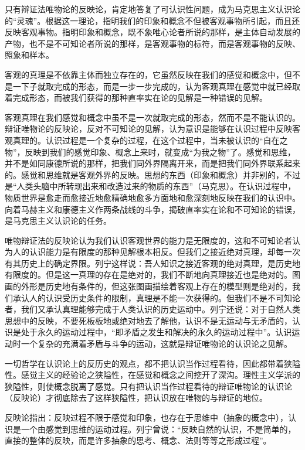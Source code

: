 只有辩证法唯物论的反映论，肯定地答复了可认识性问题，成为马克思主义认识论的“灵魂”。根据这一理论，指明我们的印象和概念不但被客观事物所引起，而且还反映客观事物。指明印象和概念，既不象唯心论者所说的那样，是主体自动发展的产物，也不是不可知论者所说的那样，是客观事物的标符，而是客观事物的反映、照象和样本。

客观的真理是不依靠主体而独立存在的，它虽然反映在我们的感觉和概念中，但不是一下子就取完成的形态，而是一步一步完成的，认为客观真理在感觉中就已经取着完成形态，而被我们获得的那种直率实在论的见解是一种错误的见解。

客观真理在我们感觉和概念中虽不是一次就取完成的形态，然而不是不能认识的。辩证唯物论的反映论，反对不可知论的见解，认为意识是能够在认识过程中反映客观真理的。认识过程是一个复杂的过程，在这个过程中，当未被认识的“自在之物”，反映到我们的感觉印象、概念上来时，就变成“为我之物”了。感觉和思维，并不是如同康德所说的那样，把我们同外界隔离开来，而是把我们同外界联系起来的。感觉和思维就是客观外界的反映。思想的东西（印象和概念）并非别的，不过是“人类头脑中所转现出来和改造过来的物质的东西”（马克思）。在认识过程中，物质世界是愈走而愈接近地愈精确地愈多方面地和愈深刻地反映在我们的认识中。向着马赫主义和康德主义作两条战线的斗争，揭破直率实在论和不可知论的错误，是马克思主义认识论的任务。

唯物辩证法的反映论认为我们认识客观世界的能力是无限度的，这和不可知论者认为人的认识能力是有限度的那种见解根本相反。但我们之接近绝对真理，却每一次有其历史上的确定界限。列宁这样说：吾人知识之接近客观的绝对真理，是历史地有限度的。但是这一真理的存在是绝对的，我们不断地向真理接近也是绝对的。图画的外形是历史地有条件的，但这张图画描绘着客观上存在的模型则是绝对的，我们承认人的认识受历史条件的限制，真理是不能一次获得的。但我们不是不可知论者，我们又承认真理能够完成于人类认识的历史运动中。列宁还说：对于自然人类思想中的反映，不要死板板地或绝对地去了解他，认识不是无运动与无矛盾的，认识是处于永久的运动过程中，“即矛盾之发生和解决的永久的运动过程中”。认识运动时一个复杂的充满着矛盾与斗争的运动，这就是辩证唯物论的认识论之见解。

一切哲学在认识论上的反历史的观点，都不把认识当作过程看待，因此都带着狭隘性。感觉主义的经验论之狭隘性，在感觉和概念之间挖开了深沟。理性主义学派的狭隘性，则使概念脱离了感觉。只有把认识当作过程看待的辩证唯物论的认识论（反映论）才彻底除去了这样狭隘性，把认识放在唯物的与辩证的地位。

反映论指出：反映过程不限于感觉和印象，也存在于思维中（抽象的概念中），认识是一个由感觉到思维的运动过程。列宁曾说：“反映自然的认识，不是简单的，直接的整体的反映，而是许多抽象的思考、概念、法则等等之形成过程”。

